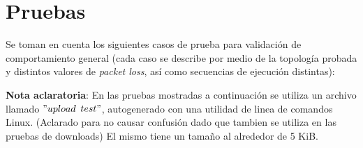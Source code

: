 \documentclass[11pt,a4paper]{article}
\begin{document}
\newpage

\section{Pruebas}

Se toman en cuenta los siguientes casos de prueba para validación de comportamiento general (cada caso se describe por medio de la topología probada y distintos valores de \textit{packet loss}, así como secuencias de ejecución distintas):

\textbf{Nota aclaratoria}: En las pruebas mostradas a continuación se utiliza un archivo llamado $"upload$ $test"$, autogenerado con una utilidad de linea de comandos Linux. (Aclarado para no causar confusión dado que tambien se utiliza en las pruebas de downloads) El mismo tiene un tamaño al alrededor de 5 KiB.  
\end{document}
